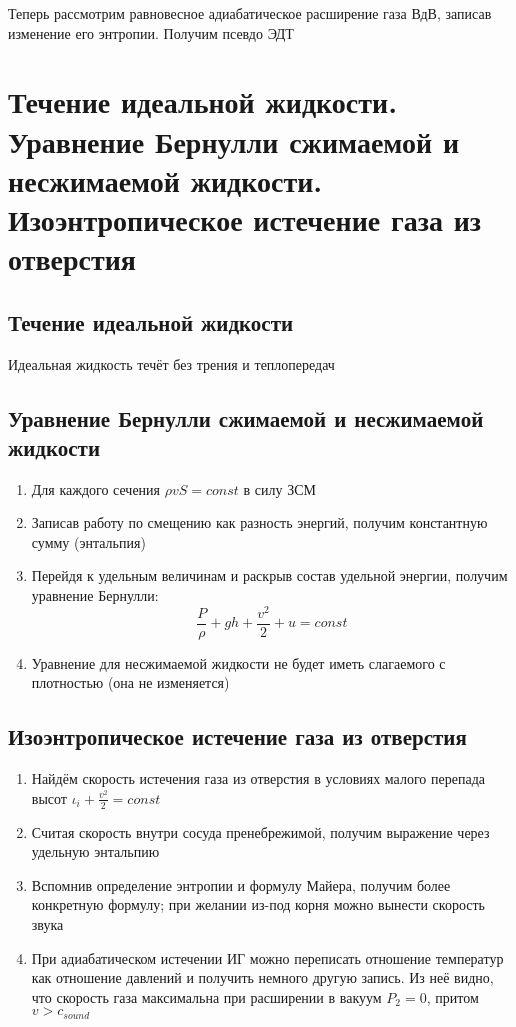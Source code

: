 \documentclass[a4paper, 14pt]{article}
\begin{document}
    Теперь рассмотрим равновесное адиабатическое расширение газа ВдВ, записав изменение его энтропии.
    Получим псевдо ЭДТ

    \section{Течение идеальной жидкости.
    Уравнение Бернулли сжимаемой и несжимаемой жидкости.
    Изоэнтропическое истечение газа из отверстия}

    \subsection{Течение идеальной жидкости}

    Идеальная жидкость течёт без трения и теплопередач

    \subsection{Уравнение Бернулли сжимаемой и несжимаемой жидкости}

    \begin{enumerate}
        \item Для каждого сечения $\rho vS = const$ в силу ЗСМ
        \item Записав работу по смещению как разность энергий, получим константную сумму (энтальпия)
        \item Перейдя к удельным величинам и раскрыв состав удельной энергии, получим уравнение Бернулли:
        \[ \frac{P}{\rho} + gh + \frac{v^2}{2} + u = const \]
        \item Уравнение для несжимаемой жидкости не будет иметь слагаемого с плотностью (она не изменяется)
    \end{enumerate}

    \subsection{Изоэнтропическое истечение газа из отверстия}

    \begin{enumerate}
        \item Найдём скорость истечения газа из отверстия в условиях малого перепада высот $\iota_i + \frac{v^2}{2} = const$
        \item Считая скорость внутри сосуда пренебрежимой, получим выражение через удельную энтальпию
        \item Вспомнив определение энтропии и формулу Майера, получим более конкретную формулу; при желании из-под
        корня можно вынести скорость звука
        \item При адиабатическом истечении ИГ можно переписать отношение температур как отношение давлений и получить
        немного другую запись.
        Из неё видно, что скорость газа максимальна при расширении в вакуум $P_2 = 0$, притом $v > c_{sound}$
    \end{enumerate}
\end{document}
